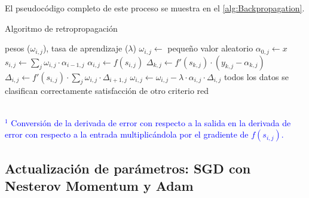 El pseudocódigo completo de este proceso se muestra en el \autoref{alg:Backpropagation}.
\begin{algorithm}
\caption{Algoritmo de retropropagación}
\label{alg:Backpropagation}
\begin{algorithmic}[1]
        \State \VARIABLES pesos ($\omega_{i,j}$), tasa de aprendizaje ($\lambda$)
         
            \State $\omega_{i,j} \gets$ pequeño valor aleatorio
        \EndFor
        \Repeat
             
                    \State $\alpha_{0,j} \gets x$ 
                \EndFor
                        \State $s_{i,j} \gets \sum\limits_{j} \omega_{i,j}\cdot \alpha_{i-1,j}$
                        \State $\alpha_{i,j} \gets f(s_{i,j})$ 
                    \EndFor
                \EndFor
                 
                    \State $\Delta_{k,j} \gets f'(s_{k,j})\cdot (y_{k,j} - \alpha_{k,j})$ \textcolor{blue}{\footnotemark[1]}
                \EndFor
                        \State $\Delta_{i,j} \gets f'(s_{i,j})\cdot \sum\limits_{j} \omega_{i,j}\cdot \Delta_{i+1,j}$ \textcolor{blue}{\footnotemark[1]}
                    \EndFor
                \EndFor
                 
                    \State $\omega_{i,j} \gets \omega_{i,j} - \lambda \cdot \alpha_{i,j} \cdot \Delta_{i,j}$ 
                \EndFor
            \EndFor
        \Until todos los datos se clasifican correctamente \OR satisfacción de otro criterio
        \State \Return red
    \EndFunction
\end{algorithmic}
\textcolor{blue}{\footnotesize{\\ $^1$ Conversión de la derivada de error con respecto a la salida en la derivada de error con respecto a la entrada multiplicándola por el gradiente de $f(s_{i,j})$.}}
\end{algorithm}

\subsection{Actualización de parámetros: SGD con Nesterov Momentum y Adam} \label{Chapter:Optimizers}

